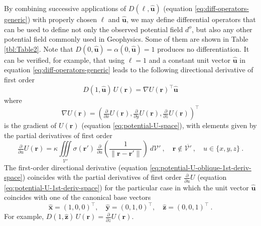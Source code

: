 By combining successive applications of $D(\ell, \hat{\mathbf{u}})$ (equation \ref{eq:diff-operators-generic})
with properly chosen $\ell$ and $\hat{\mathbf{u}}$, we may define differential operators that 
can be used to define not only the observed potential field $d^{o}$, but also any other potential 
field commonly used in Geophysics.
Some of them are shown in Table \ref{tbl:Table2}.
Note that $D(0, \hat{\mathbf{u}}) = \alpha(0, \hat{\mathbf{u}}) = 1$ produces no differentiation.
It can be verified, for example, that using $\ell = 1$ and a constant unit vector $\hat{\mathbf{u}}$
in equation \ref{eq:diff-operators-generic} leads to the following directional derivative 
of first order
\begin{equation}
	D(1, \hat{\mathbf{u}}) \, U(\mathbf{r}) = \nabla U(\mathbf{r})^{\top} \hat{\mathbf{u}}
	\label{eq:potential-U-oblique-1st-deriv-space}
\end{equation}
where
\begin{equation}
	\nabla U(\mathbf{r}) = \left( 
	\tfrac{\partial}{\partial x} U(\mathbf{r}),
	\tfrac{\partial}{\partial y} U(\mathbf{r}),
	\tfrac{\partial}{\partial z} U(\mathbf{r}) \right)^{\top}
	\label{eq:potential-U-grad-space}
\end{equation}
is the gradient of $U(\mathbf{r})$ (equation \ref{eq:potential-U-space}), with elements
given by the partial derivatives of first order
\begin{equation}
	\tfrac{\partial}{\partial u} U(\mathbf{r}) = \kappa \iiint\limits_{\mathcal{V}'}
	\sigma(\mathbf{r}') \: 
	\tfrac{\partial}{\partial u} \left( \frac{1}{\| \mathbf{r} - \mathbf{r}'\|} \right)
	\: d\mathcal{V}' \: , 
	\quad \mathbf{r} \notin \overline{\mathcal{V}'} \: , \quad u \in \{ x, y, z \} \: .
	\label{eq:potential-U-1st-deriv-space}
\end{equation}
The first-order directional derivative (equation \ref{eq:potential-U-oblique-1st-deriv-space})
coincides with the partial derivatives of first order $\tfrac{\partial}{\partial u} U$ (equation \ref{eq:potential-U-1st-deriv-space})
for the particular case in which the unit vector $\hat{\mathbf{u}}$ coincides with one of the canonical base vectors
\begin{equation}
	\hat{\mathbf{x}} = (1,0,0)^{\top} , \quad 
	\hat{\mathbf{y}} = (0,1,0)^{\top} , \quad
	\hat{\mathbf{z}} = (0,0,1)^{\top} \: .
	\label{eq:canonical-base-vector}
\end{equation}
For example, $D(1, \hat{\mathbf{z}}) \, U(\mathbf{r}) = \tfrac{\partial}{\partial z} U(\mathbf{r})$.

